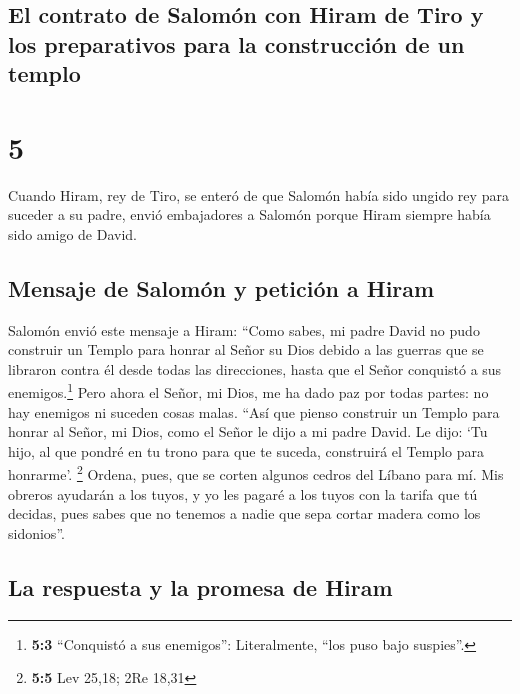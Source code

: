 \hypertarget{el-contrato-de-salomuxf3n-con-hiram-de-tiro-y-los-preparativos-para-la-construcciuxf3n-de-un-templo}{%
\subsection{El contrato de Salomón con Hiram de Tiro y los preparativos
para la construcción de un
templo}\label{el-contrato-de-salomuxf3n-con-hiram-de-tiro-y-los-preparativos-para-la-construcciuxf3n-de-un-templo}}

\hypertarget{section-4}{%
\section{5}\label{section-4}}

 Cuando Hiram, rey de Tiro, se enteró de que Salomón había
sido ungido rey para suceder a su padre, envió embajadores a Salomón
porque Hiram siempre había sido amigo de David.

\hypertarget{mensaje-de-salomuxf3n-y-peticiuxf3n-a-hiram}{%
\subsection{Mensaje de Salomón y petición a
Hiram}\label{mensaje-de-salomuxf3n-y-peticiuxf3n-a-hiram}}

 Salomón envió este mensaje a Hiram:  ``Como
sabes, mi padre David no pudo construir un Templo para honrar al Señor
su Dios debido a las guerras que se libraron contra él desde todas las
direcciones, hasta que el Señor conquistó a sus enemigos.\footnote{\textbf{5:3}
  ``Conquistó a sus enemigos'': Literalmente, ``los puso bajo suspies''.}
 Pero ahora el Señor, mi Dios, me ha dado paz por todas
partes: no hay enemigos ni suceden cosas malas.  ``Así que
pienso construir un Templo para honrar al Señor, mi Dios, como el Señor
le dijo a mi padre David. Le dijo: `Tu hijo, al que pondré en tu trono
para que te suceda, construirá el Templo para honrarme'. \footnote{\textbf{5:5}
  Lev 25,18; 2Re 18,31}  Ordena, pues, que se corten
algunos cedros del Líbano para mí. Mis obreros ayudarán a los tuyos, y
yo les pagaré a los tuyos con la tarifa que tú decidas, pues sabes que
no tenemos a nadie que sepa cortar madera como los sidonios''.

\hypertarget{la-respuesta-y-la-promesa-de-hiram}{%
\subsection{La respuesta y la promesa de
Hiram}\label{la-respuesta-y-la-promesa-de-hiram}}

